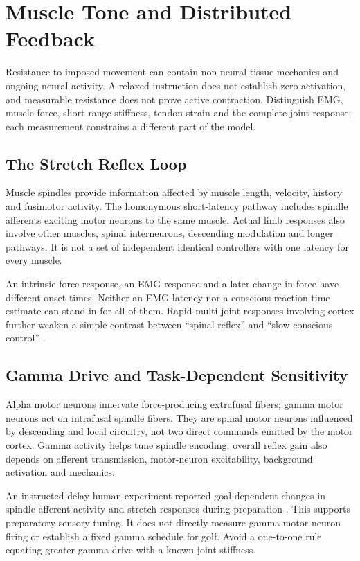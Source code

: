 \section{Muscle Tone and Distributed Feedback}
\label{sec:muscle_tone}

Resistance to imposed movement can contain non-neural tissue mechanics and ongoing neural activity. A relaxed instruction does not establish zero activation, and measurable resistance does not prove active contraction. Distinguish EMG, muscle force, short-range stiffness, tendon strain and the complete joint response; each measurement constrains a different part of the model.

\subsection{The Stretch Reflex Loop}
\label{subsec:stretch_reflex}

Muscle spindles provide information affected by muscle length, velocity, history and fusimotor activity. The homonymous short-latency pathway includes spindle afferents exciting motor neurons to the same muscle. Actual limb responses also involve other muscles, spinal interneurons, descending modulation and longer pathways. It is not a set of independent identical controllers with one latency for every muscle.

An intrinsic force response, an EMG response and a later change in force have different onset times. Neither an EMG latency nor a conscious reaction-time estimate can stand in for all of them. Rapid multi-joint responses involving cortex further weaken a simple contrast between ``spinal reflex'' and ``slow conscious control'' \citep{Pruszynski2011Feedback}.

\subsection{Gamma Drive and Task-Dependent Sensitivity}
\label{subsec:gamma_drive}

Alpha motor neurons innervate force-producing extrafusal fibers; gamma motor neurons act on intrafusal spindle fibers. They are spinal motor neurons influenced by descending and local circuitry, not two direct commands emitted by the motor cortex. Gamma activity helps tune spindle encoding; overall reflex gain also depends on afferent transmission, motor-neuron excitability, background activation and mechanics.

An instructed-delay human experiment reported goal-dependent changes in spindle afferent activity and stretch responses during preparation \citep{Papaioannou2021Preparation}. This supports preparatory sensory tuning. It does not directly measure gamma motor-neuron firing or establish a fixed gamma schedule for golf. Avoid a one-to-one rule equating greater gamma drive with a known joint stiffness.

